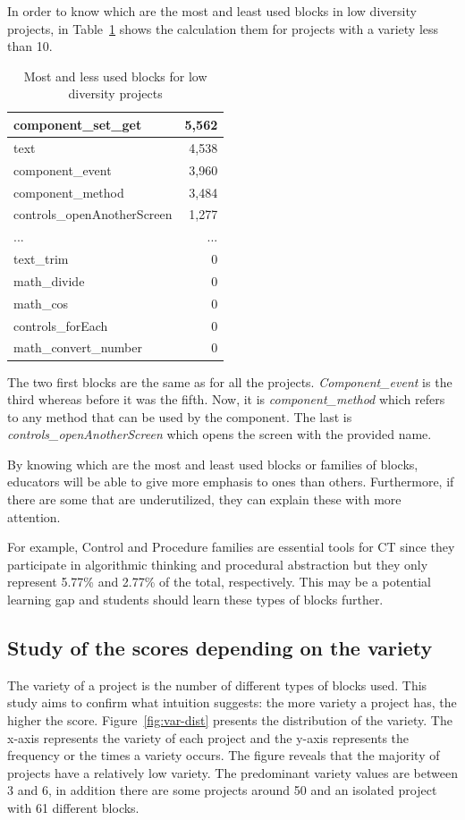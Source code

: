 \documentclass[a4paper]{article}
\begin{document}
In order to know which are the most and least used blocks in low diversity projects, in Table~\ref{tab:most-least-low} shows the calculation them for projects with a variety less than 10.

\begin{table}[ht]
\begin{center}
\caption{Most and less used blocks for low diversity projects}
\bigskip
\label{tab:most-least-low}
\begin{tabular}{|l|r|}
\hline
component\_set\_get & 5,562\\ \hline
text & 4,538\\ \hline
component\_event & 3,960\\ \hline
component\_method & 3,484\\ \hline
controls\_openAnotherScreen & 1,277\\ \hline
... & ... \\ \hline
text\_trim & 0\\ \hline
math\_divide & 0\\ \hline
math\_cos & 0\\ \hline
controls\_forEach & 0\\ \hline
math\_convert\_number & 0\\ \hline
\end{tabular}
\end{center}
\end{table}

The two first blocks are the same as for all the projects. \emph{Component\_event} is the third whereas before it was the fifth. Now, it is \emph{component\_method} which refers to any method that can be used by the component. The last is \emph{controls\_openAnotherScreen} which opens the screen with the provided name.

By knowing which are the most and least used blocks or families of blocks, educators will be able to give more emphasis to ones than others. Furthermore, if there are some that are underutilized, they can explain these with more attention.

For example, Control and Procedure families are essential tools for CT since they participate in algorithmic thinking and procedural abstraction but they only represent 5.77\% and 2.77\% of the total, respectively. This may be a potential learning gap and students should learn these types of blocks further.

\subsection{Study of the scores depending on the variety}
The variety of a project is the number of different types of blocks used. This study aims to confirm what intuition suggests: the more variety a project has, the higher the score. 
Figure~\ref{fig:var-dist} presents the distribution of the variety. The x-axis represents the variety of each project and the y-axis represents the frequency or the times a variety occurs. The figure reveals that the majority of projects have a relatively low variety. The predominant variety values are between 3 and 6, in addition there are some projects around 50 and an isolated project with 61 different blocks. 
\end{document}

